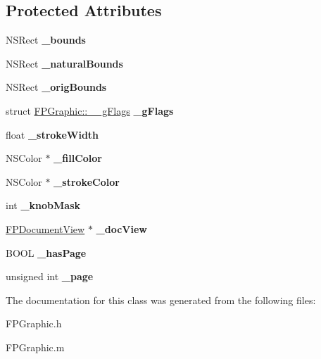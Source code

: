 \subsection*{Protected Attributes}
\begin{DoxyCompactItemize}
\item 
\mbox{\label{interface_f_p_graphic_a477a7dbbd22695f4285cb80c40331d76}} 
N\+S\+Rect {\bfseries \+\_\+bounds}
\item 
\mbox{\label{interface_f_p_graphic_aa5ffe887c8d4ce702d0e48b9ffaabc4c}} 
N\+S\+Rect {\bfseries \+\_\+natural\+Bounds}
\item 
\mbox{\label{interface_f_p_graphic_ad0f42d58f43ca069375addf204eb6d96}} 
N\+S\+Rect {\bfseries \+\_\+orig\+Bounds}
\item 
\mbox{\label{interface_f_p_graphic_a057a578a6190ab52a43c2a072b5d39e8}} 
struct \mbox{\hyperlink{struct_f_p_graphic_1_1____g_flags}{F\+P\+Graphic\+::\+\_\+\+\_\+g\+Flags}} {\bfseries \+\_\+g\+Flags}
\item 
\mbox{\label{interface_f_p_graphic_ab046a1a11cfaec1ea0497b36fac0de96}} 
float {\bfseries \+\_\+stroke\+Width}
\item 
\mbox{\label{interface_f_p_graphic_a46af3f4da79906b203dc58fe049fa783}} 
N\+S\+Color $\ast$ {\bfseries \+\_\+fill\+Color}
\item 
\mbox{\label{interface_f_p_graphic_a5953d5d57cec8c6b21e838fd7ccc9fe6}} 
N\+S\+Color $\ast$ {\bfseries \+\_\+stroke\+Color}
\item 
\mbox{\label{interface_f_p_graphic_a63b273cf6710a125576c2436aaa52d10}} 
int {\bfseries \+\_\+knob\+Mask}
\item 
\mbox{\label{interface_f_p_graphic_a714304bdc9a63b50469e9cd75b1e69d0}} 
\mbox{\hyperlink{interface_f_p_document_view}{F\+P\+Document\+View}} $\ast$ {\bfseries \+\_\+doc\+View}
\item 
\mbox{\label{interface_f_p_graphic_a0c58fb9c9c0a4c1fad8eab40b080206b}} 
B\+O\+OL {\bfseries \+\_\+has\+Page}
\item 
\mbox{\label{interface_f_p_graphic_a35804bbbbaed7a96b8c4d3bf6a45ade9}} 
unsigned int {\bfseries \+\_\+page}
\end{DoxyCompactItemize}


The documentation for this class was generated from the following files\+:\begin{DoxyCompactItemize}
\item 
F\+P\+Graphic.\+h\item 
F\+P\+Graphic.\+m\end{DoxyCompactItemize}
